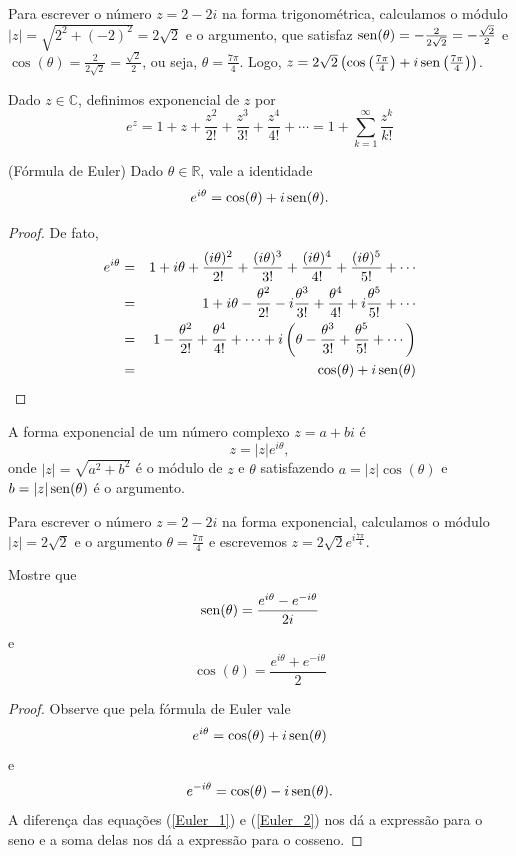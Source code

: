 \begin{ex}Para escrever o número $z=2-2i$ na forma trigonométrica, calculamos o módulo $|z|=\sqrt{2^2+(-2)^2}=2\sqrt{2}$ e o argumento, que satisfaz $\operatorname{sen}(\theta)=-\frac{2}{2\sqrt{2}}=-\frac{\sqrt{2}}{2}$ e $\cos(\theta)=\frac{2}{2\sqrt{2}}=\frac{\sqrt{2}}{2}$, ou seja, $\theta=\frac{7\pi}{4}$. Logo, $z=2\sqrt{2}\left(\cos\left(\frac{7\pi}{4}\right)+i\operatorname{sen}\left(\frac{7\pi}{4}\right)\right)$. 
\end{ex}
\begin{defn}Dado $z\in\mathbb{C}$, definimos exponencial de $z$ por
$$
e^z=1+z+\frac{z^2}{2!}+\frac{z^3}{3!}+\frac{z^4}{4!}+\cdots=1+\sum_{k=1}^\infty \frac{z^k}{k!}
$$
\end{defn}
\begin{prop}(Fórmula de Euler) Dado $\theta\in\mathbb{R}$, vale a identidade
$$
e^{i\theta}=\cos(\theta)+i\operatorname{sen}(\theta).
$$
\end{prop}
\begin{proof}
De fato,
\begin{eqnarray*}
e^{i\theta}&=&1+i\theta+\frac{(i \theta)^2}{2!}+\frac{(i\theta)^3}{3!}+\frac{(i\theta)^4}{4!}+\frac{(i\theta)^5}{5!}+\cdots\\
&=&1+i\theta-\frac{\theta^2}{2!}-i\frac{\theta^3}{3!}+\frac{\theta^4}{4!}+i\frac{\theta^5}{5!}+\cdots\\
&=&1-\frac{\theta^2}{2!}+\frac{\theta^4}{4!}+\cdots    +i\left(\theta-\frac{\theta^3}{3!}+\frac{\theta^5}{5!}+\cdots\right)\\
&=&\cos(\theta)    +i\operatorname{sen}(\theta)
\end{eqnarray*}
\end{proof}
\begin{defn}A forma exponencial de um número complexo $z=a+bi$ é 
$$
z=|z|e^{i\theta},
$$
onde $|z|=\sqrt{a^2+b^2}$ é o módulo de $z$ e $\theta$ satisfazendo $a=|z|\cos(\theta)$ e $b=|z|\operatorname{sen}(\theta)$ é o argumento.
\end{defn}
\begin{ex}Para escrever o número $z=2-2i$ na forma exponencial, calculamos o módulo $|z|=2\sqrt{2}$ e o argumento $\theta=\frac{7\pi}{4}$ e escrevemos $z=2\sqrt{2}e^{i\frac{7\pi}{4}}$. 
\end{ex}
\begin{prob}{\label{prob_sin_euler}}Mostre que
$$
\operatorname{sen}(\theta)=\frac{e^{i\theta}-e^{-i\theta}}{2i}
$$
e
$$
\cos(\theta)=\frac{e^{i\theta}+e^{-i\theta}}{2}
$$
\end{prob}
\begin{proof}
Observe que pela fórmula de Euler vale
\begin{equation}{\label{Euler_1}}
e^{i\theta}=\cos(\theta)+i\operatorname{sen}(\theta)
\end{equation}
e
\begin{equation}{\label{Euler_2}}
e^{-i\theta}=\cos(\theta)-i\operatorname{sen}(\theta).
\end{equation}
A diferença das equações (\ref{Euler_1}) e (\ref{Euler_2}) nos dá a expressão para o seno e a soma delas nos dá a expressão para o cosseno.
\end{proof}
